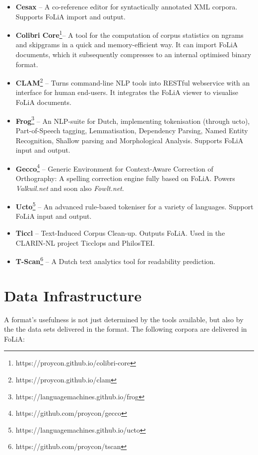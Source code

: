 \documentclass[a4paper,10pt,twoside]{article}
\begin{document}
\begin{itemize}
\item \textbf{Cesax} -- A co-reference editor for syntactically annotated XML corpora.
    Supports FoLiA import and output.\cite{CESAX} 
\item \textbf{Colibri Core}\footnote{https://proycon.github.io/colibri-core}-- A tool for the computation
    of corpus statistics on ngrams and skipgrams in a quick and
    memory-efficient way. It can import FoLiA documents, which it subsequently
    compresses to an internal optimised binary format.
\item \textbf{CLAM}\footnote{https://proycon.github.io/clam} -- Turns command-line NLP tools into RESTful webservice with an
    interface for human end-users. It integrates the FoLiA viewer to visualise
    FoLiA documents.\cite{CLAM}
\item \textbf{Frog}\footnote{https://languagemachines.github.io/frog} -- An NLP-suite for Dutch, implementing tokenisation (through
    ucto), Part-of-Speech tagging, Lemmatisation, Dependency Parsing, Named
    Entity Recognition, Shallow parsing and Morphological Analysis. Supports
    FoLiA input and output.
\item \textbf{Gecco}\footnote{https://github.com/proycon/gecco}  -- Generic Environment for Context-Aware Correction
    of Orthography: A spelling correction engine fully based on FoLiA. Powers
    \emph{Valkuil.net} and soon also \emph{Fowlt.net}.
\item \textbf{Ucto}\footnote{https://languagemachines.github.io/ucto} -- An advanced rule-based tokeniser for a variety of
    languages. Support FoLiA
    input and output.\cite{UCTO}
\item \textbf{Ticcl} -- Text-Induced Corpus Clean-up. Outputs FoLiA. Used in the
    CLARIN-NL project Ticclops and PhilosTEI.\cite{TICCL}
\item \textbf{T-Scan}\footnote{https://github.com/proycon/tscan} -- A Dutch text analytics tool for readability
    prediction.\cite{TSCAN}
\end{itemize}


\section{Data Infrastructure}

A format's usefulness is not just determined by the tools
available, but also by the the data sets delivered in the format.
The following corpora are delivered in FoLiA:
\end{document}
